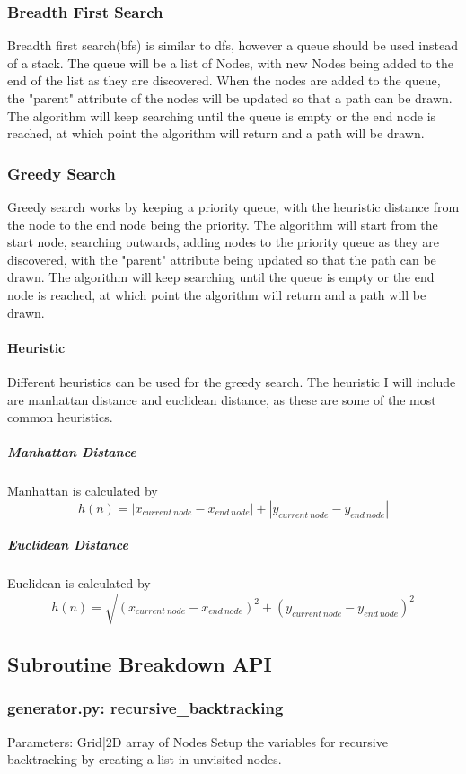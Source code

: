 \documentclass{article}
\begin{document}
\subsubsection{Breadth First Search}
Breadth first search(bfs) is similar to dfs, however a queue should be used instead of a stack. The queue will be a list of Nodes, with new Nodes being added to the end of the list as they are discovered. When the nodes are added to the queue, the "parent" attribute of the nodes will be updated so that a path can be drawn. The algorithm will keep searching until the queue is empty or the end node is reached, at which point the algorithm will return and a path will be drawn.

\subsubsection{Greedy Search}
Greedy search works by keeping a priority queue, with the heuristic distance from the node to the end node being the priority. The algorithm will start from the start node, searching outwards, adding nodes to the priority queue as they are discovered, with the "parent" attribute being updated so that the path can be drawn. The algorithm will keep searching until the queue is empty or the end node is reached, at which point the algorithm will return and a path will be drawn.
\paragraph*{Heuristic}
Different heuristics can be used for the greedy search. The heuristic I will include are manhattan distance and euclidean distance, as these are some of the most common heuristics.

\subparagraph*{Manhattan Distance}
Manhattan is calculated by
\begin{equation}
    h(n) = |x_{current\ node} - x_{end\ node}| + |y_{current\ node} - y_{end\ node}|
\end{equation}
\subparagraph*{Euclidean Distance}
Euclidean is calculated by
\begin{equation}
    h(n) = \sqrt{(x_{current\ node} - x_{end\ node})^2 + (y_{current\ node} - y_{end\ node})^2}
\end{equation}

\subsection{Subroutine Breakdown API}
\subsubsection{generator.py: recursive\_backtracking}
Parameters:\newline
\indent Grid|2D array of Nodes\newline
Setup the variables for recursive backtracking by creating a list in unvisited nodes.
\end{document}
